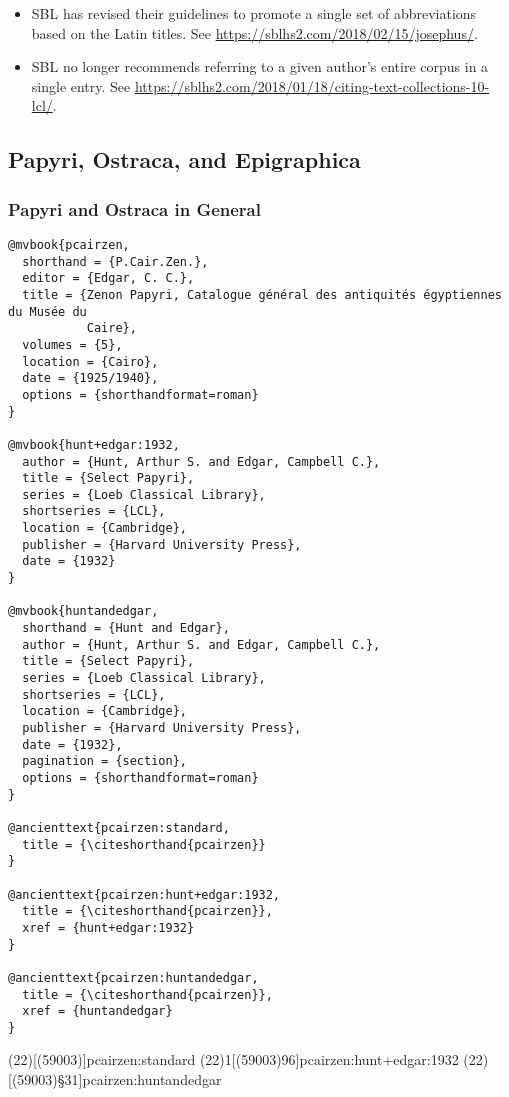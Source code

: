 \documentclass[a4paper]{article}
\begin{document}
\begin{itemize}
  \item SBL has revised their guidelines to promote a single set of
    abbreviations based on the Latin titles. See
    \url{https://sblhs2.com/2018/02/15/josephus/}.
  \item SBL no longer recommends referring to a given author's entire corpus
    in a single entry. See
    \url{https://sblhs2.com/2018/01/18/citing-text-collections-10-lcl/}.
\end{itemize}

\subsection{Papyri, Ostraca, and Epigraphica}

\subsubsection{Papyri and Ostraca in General}

\begin{verbatim}
@mvbook{pcairzen,
  shorthand = {P.Cair.Zen.},
  editor = {Edgar, C. C.},
  title = {Zenon Papyri, Catalogue général des antiquités égyptiennes du Musée du
           Caire},
  volumes = {5},
  location = {Cairo},
  date = {1925/1940},
  options = {shorthandformat=roman}
}

@mvbook{hunt+edgar:1932,
  author = {Hunt, Arthur S. and Edgar, Campbell C.},
  title = {Select Papyri},
  series = {Loeb Classical Library},
  shortseries = {LCL},
  location = {Cambridge},
  publisher = {Harvard University Press},
  date = {1932}
}

@mvbook{huntandedgar,
  shorthand = {Hunt and Edgar},
  author = {Hunt, Arthur S. and Edgar, Campbell C.},
  title = {Select Papyri},
  series = {Loeb Classical Library},
  shortseries = {LCL},
  location = {Cambridge},
  publisher = {Harvard University Press},
  date = {1932},
  pagination = {section},
  options = {shorthandformat=roman}
}

@ancienttext{pcairzen:standard,
  title = {\citeshorthand{pcairzen}}
}

@ancienttext{pcairzen:hunt+edgar:1932,
  title = {\citeshorthand{pcairzen}},
  xref = {hunt+edgar:1932}
}

@ancienttext{pcairzen:huntandedgar,
  title = {\citeshorthand{pcairzen}},
  xref = {huntandedgar}
}
\end{verbatim}

\nocite{pcairzen}
\examplecite(22)[(59003)]{pcairzen:standard}
\examplevolcite(22){1}[(59003)96]{pcairzen:hunt+edgar:1932}
\examplecite(22)[(59003)§31]{pcairzen:huntandedgar}
\exampleabbreviations
\examplebibliography
\end{document}
